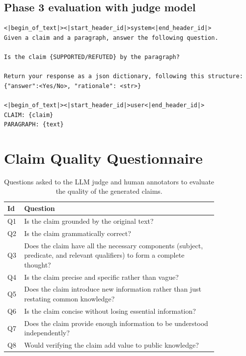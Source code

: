 \documentclass[11pt]{article}
\begin{document}
\subsection{Phase 3 evaluation with judge model}
\begin{lstlisting}[breaklines=true, columns=flexible, basicstyle=\footnotesize]
<|begin_of_text|><|start_header_id|>system<|end_header_id|>
Given a claim and a paragraph, answer the following question. 

Is the claim {SUPPORTED/REFUTED} by the paragraph?

Return your response as a json dictionary, following this structure: {"answer":<Yes/No>, "rationale": <str>}

<|begin_of_text|><|start_header_id|>user<|end_header_id|>
CLAIM: {claim}
PARAGRAPH: {text}
\end{lstlisting}

\clearpage
\section{Claim Quality Questionnaire}
\label{sec:questions}
\begin{table}[ht]
\footnotesize
\centering
\begin{tabular}{p{0.04\linewidth} | p{0.81\linewidth}} 
 \hline
 \textbf{Id} & \textbf{Question} \\ 
 \hline
 Q1 & Is the claim grounded by the original text? \\
 Q2 & Is the claim grammatically correct? \\ 
 Q3 & Does the claim have all the necessary components (subject, predicate, and relevant qualifiers) to form a complete thought? \\
 Q4 & Is the claim precise and specific rather than vague? \\ 
 Q5 & Does the claim introduce new information rather than just restating common knowledge? \\
 Q6 & Is the claim concise without losing essential information? \\ 
 Q7 & Does the claim provide enough information to be understood independently? \\
 Q8 & Would verifying the claim add value to public knowledge? \\ 
 \hline
\end{tabular}
\caption{Questions asked to the LLM judge and human annotators to evaluate the quality of the generated claims.}
\label{table:questions}
\end{table}
\end{document}
